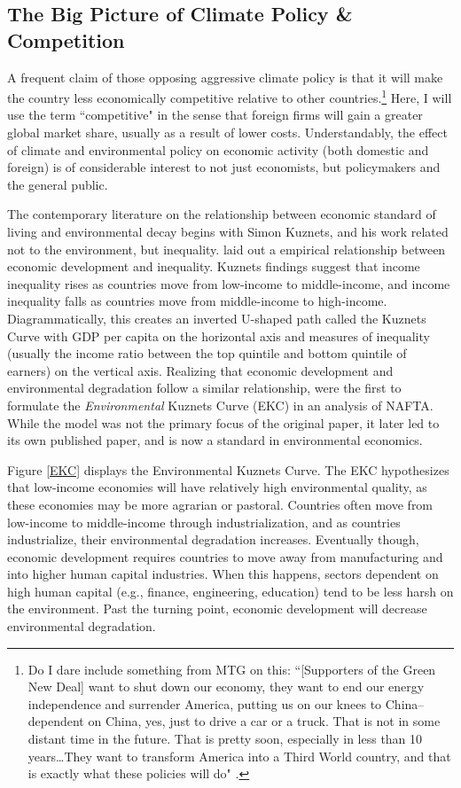 \subsection{The Big Picture of Climate Policy \& Competition}

A frequent claim of those opposing aggressive climate policy is that it will make the country less economically competitive relative to other countries.\footnote{Do I dare include something from MTG on this: ``[Supporters of the Green New Deal] want to shut down our economy, they want to end  our energy independence and surrender America, putting us on our knees to China--dependent on China, yes, just to drive a car or a truck. That is not in some distant time in the future. That is pretty soon, especially in less than 10 years\ldots They want to transform America into a Third World country, and that is exactly what these policies will do" \citep{marjorie_greene}.} Here, I will use the term ``competitive" in the sense that foreign firms will gain a greater global market share, usually as a result of lower costs. Understandably, the effect of climate and environmental policy on economic activity (both domestic and foreign) is of considerable interest to not just economists, but policymakers and the general public.

The contemporary literature on the relationship between economic standard of living and environmental decay begins with Simon Kuznets, and his work related not to the environment, but inequality. \cite{kuznets1955economic} laid out a empirical relationship between economic development and inequality. Kuznets findings suggest that income inequality rises as countries move from low-income to middle-income, and income inequality falls as countries move from middle-income to high-income. Diagrammatically, this creates an inverted U-shaped path called the Kuznets Curve with GDP per capita on the horizontal axis and measures of inequality (usually the income ratio between the top quintile and bottom quintile of earners) on the vertical axis. Realizing that economic development and environmental degradation follow a similar relationship, \cite{NBERw3914} were the first to formulate the \emph{Environmental} Kuznets Curve (EKC) in an analysis of NAFTA. While the model was not the primary focus of the original paper, it later led to its own published paper, \cite{grossman1995economic} and is now a standard in environmental economics. 

Figure \ref{EKC} displays the Environmental Kuznets Curve. The EKC hypothesizes that low-income economies will have relatively high environmental quality, as these economies may be more agrarian or pastoral. Countries often move from low-income to middle-income through industrialization, and as countries industrialize, their environmental degradation increases. Eventually though, economic development requires countries to move away from manufacturing and into higher human capital industries. When this happens, sectors dependent on high human capital (e.g., finance, engineering, education) tend to be less harsh on the environment. Past the turning point, economic development will decrease environmental degradation. 

